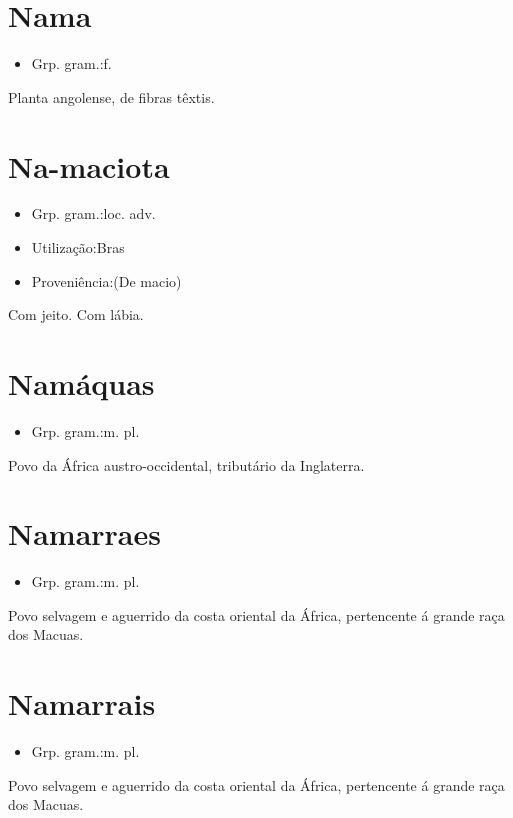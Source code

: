 \section{Nama}
\begin{itemize}
\item {Grp. gram.:f.}
\end{itemize}
Planta angolense, de fibras têxtis.
\section{Na-maciota}
\begin{itemize}
\item {Grp. gram.:loc. adv.}
\end{itemize}
\begin{itemize}
\item {Utilização:Bras}
\end{itemize}
\begin{itemize}
\item {Proveniência:(De \textunderscore macio\textunderscore )}
\end{itemize}
Com jeito.
Com lábia.
\section{Namáquas}
\begin{itemize}
\item {Grp. gram.:m. pl.}
\end{itemize}
Povo da África austro-occidental, tributário da Inglaterra.
\section{Namarraes}
\begin{itemize}
\item {Grp. gram.:m. pl.}
\end{itemize}
Povo selvagem e aguerrido da costa oriental da África, pertencente á grande raça dos Macuas.
\section{Namarrais}
\begin{itemize}
\item {Grp. gram.:m. pl.}
\end{itemize}
Povo selvagem e aguerrido da costa oriental da África, pertencente á grande raça dos Macuas.
